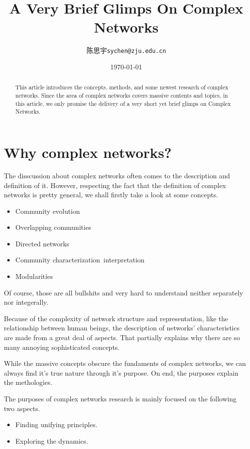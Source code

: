 \documentclass[UTF8, 11pt, a4paper]{ctexart}
\title{A Very Brief Glimps On Complex Networks}
\author{陈思宇\texttt{sychen@zju.edu.cn}}
\date{\today}
\begin{document}
\maketitle

\begin{abstract}
This article introduces the concepts, methods, and some newest research of complex networks. Since the area of complex networks covers massive contents and topics, in this article, we only promise the delivery of a very short yet brief glimps on Complex Networks.
\end{abstract}

\newpage
\tableofcontents
\newpage


\section{Why complex networks?}

The disscussion about complex networks often comes to the description and definition of it. However, respecting the fact that the definition of complex networks is pretty general, we shall firstly take a look at some concepts.

\begin{itemize}
\item Community evolution
\item Overlapping communities
\item Directed networks
\item Community characterization\ interpretation
\item Modularities
\end{itemize}

Of course, those are all bullshits and very hard to understand neither separately nor integerally.

Because of the complexity of network structure and representation, like the relationship between human beings, the description of networks' characteristics are made from a great deal of aspects. That partially explains why there are so many annoying sophisticated concepts.

While the massive concepts obscure the fundaments of complex networks, we can always find it's true nature through it's purpose. On end, the purposes explain the methologies.

The purposes of complex networks research is mainly focused on the following two aspects.

\begin{itemize}
\item Finding unifying principles.
\item Exploring the dynamics.
\end{itemize}
\end{document}
